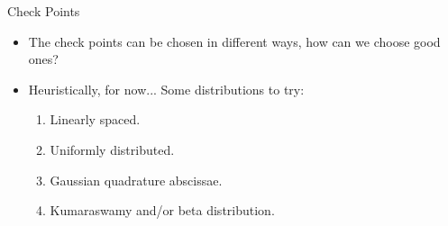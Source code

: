 \documentclass{beamer}
\begin{document}
\begin{frame}{Check Points}
  \begin{itemize}
  \item The check points can be chosen in different ways, how can we choose good ones?
    \pause
  \item Heuristically, for now... Some distributions to try:
    \begin{enumerate}
    \item Linearly spaced.
    \item Uniformly distributed.
    \item Gaussian quadrature abscissae.
    \item Kumaraswamy and/or beta distribution.
    \end{enumerate}
  \end{itemize}
\end{frame}
\end{document}

